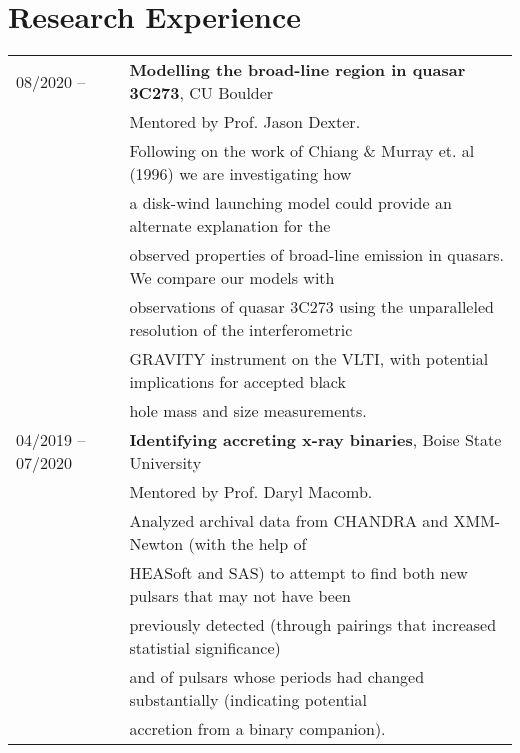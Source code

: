 \documentclass[11pt]{article}
\begin{document}
\section{Research Experience}
\begin{tabular}{ll}
08/2020 -- & 	\textbf{Modelling the broad-line region in quasar 3C273}, CU Boulder \vspace{1mm} \\
			&	Mentored by Prof. Jason Dexter.\vspace{1mm} \\
      & Following on the work of Chiang \& Murray et. al (1996) we are investigating how \\
      & a disk-wind launching model could provide an alternate explanation for the \\
      & observed properties of broad-line emission in quasars. We compare our models with \\
      & observations of quasar 3C273 using the unparalleled resolution of the interferometric \\
      & GRAVITY instrument on the VLTI, with potential implications for accepted black \\
      & hole mass and size measurements.\vspace{1mm}\\
04/2019 -- 07/2020		& 	\textbf{Identifying accreting x-ray binaries}, Boise State University \vspace{1mm} \\
			&	Mentored by Prof. Daryl Macomb.\vspace{1mm} \\
      & Analyzed archival data from CHANDRA and XMM-Newton (with the help of \\
      & HEASoft and SAS) to attempt to find both new pulsars that may not have been\\
      & previously detected (through pairings that increased statistial significance) \\
      & and of pulsars whose periods had changed substantially (indicating potential \\
      & accretion from a binary companion).\\

\end{tabular}
\end{document}

